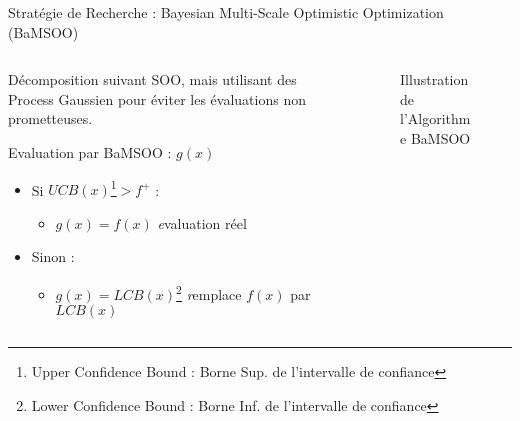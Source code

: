\begin{frame}{Stratégie de Recherche : Bayesian Multi-Scale Optimistic Optimization (BaMSOO)}
    \begin{columns}
        
        \begin{column}{0.5\textwidth} 
            \vspace*{10pt}

            Décomposition suivant SOO, mais utilisant des Process Gaussien pour éviter les évaluations non prometteuses. 

            \begin{block}{Evaluation par BaMSOO : $g(x)$}
                \begin{itemize}
                    \item Si $UCB(x)$\footnote[2]{Upper Confidence Bound : Borne Sup. de l'intervalle de confiance}$ > f^+$ :
                    \begin{itemize}
                        \setlength{\itemindent}{5pt}
                        \item $g(x) = f(x)$ {\small \color{black!50} \textit  evaluation réel}
                    \end{itemize}
                    \item Sinon : 
                    \begin{itemize}
                        \setlength{\itemindent}{5pt}
                        \item $g(x) = LCB(x)$\footnote[3]{Lower Confidence Bound : Borne Inf. de l'intervalle de confiance} {\small \color{black!50} \textit remplace $f(x)$ par $LCB(x)$}
                    \end{itemize}
                \end{itemize}
                
            \end{block}
     
            \end{column}
                 
            \begin{column}{0.45\textwidth}
                \begin{figure}
                    \centering
                    
                    \vspace*{-10pt}\caption{Illustration de l'Algorithme BaMSOO}
                \end{figure} 
            \end{column}
                 
    \end{columns}
\end{frame}

